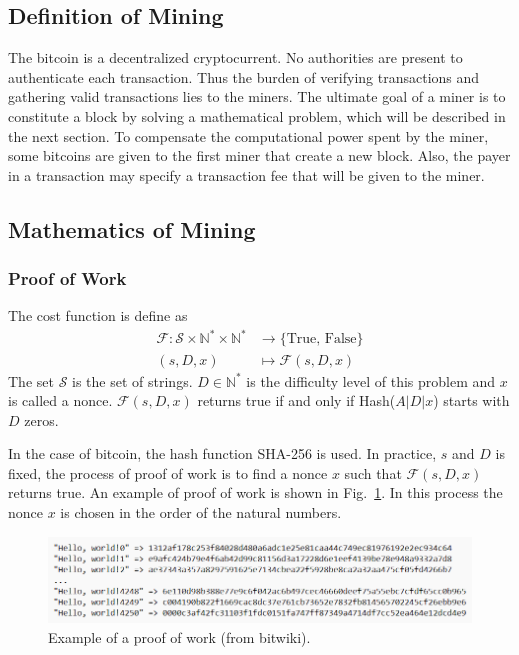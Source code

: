 \documentclass[12pt,a4paper]{article}
\begin{document}
\subsection{Definition of Mining}
The bitcoin is a decentralized cryptocurrent. No authorities are present to authenticate each transaction. Thus the burden of verifying transactions and gathering valid transactions lies to the miners. The ultimate goal of a miner is to constitute a block by solving a mathematical problem, which will be described in the next section. To compensate the computational power spent by the miner, some bitcoins are given to the first miner that create a new block. Also, the payer in a transaction may specify a transaction fee that will be given to the miner. 
\subsection{Mathematics of Mining}
\subsubsection{Proof of Work}
The cost function is define as 
\begin{align*}
\mathcal{F}: \mathcal{S}\times \mathbb{N}^* \times \mathbb{N}^* &\longrightarrow \{\text{True, False}\}\\
(s, D, x)&\longmapsto \mathcal{F}(s, D, x)
\end{align*}
The set $\mathcal{S}$ is the set of strings. $D \in \mathbb{N}^*$ is the difficulty level of this problem and $x$ is called a nonce. $\mathcal{F}(s, D, x)$ returns true if and only if Hash($A|D|x$) starts with $D$ zeros. 


In the case of bitcoin, the hash function SHA-256 is used. In practice, $s$ and $D$ is fixed, the process of proof of work is to find a nonce $x$ such that $\mathcal{F}(s, D, x)$ returns true. An example of proof of work is shown in Fig.~\ref{fig:hash}. In this process the nonce $x$ is chosen in the order of the natural numbers.

\begin{figure}[tbph!]
	\centering
	\includegraphics[width=0.9\linewidth]{Hash}
	\caption{Example of a proof of work (from bitwiki).}
	\label{fig:hash}
\end{figure}
\end{document}
